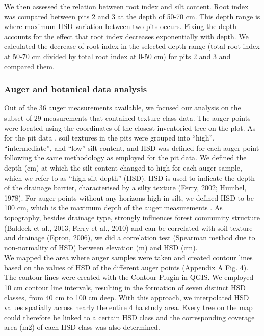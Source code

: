 \documentclass[fleqn,12pt]{latex/stylish_article} %
\begin{document}
We then assessed the relation between root index and silt content. Root index was compared between pits 2 and 3 at the depth of 50-70 cm. This depth range is where maximum HSD variation between two pits occurs. Fixing the depth accounts for the effect that root index decreases exponentially with depth. We calculated the decrease of root index in the selected depth range (total root index at 50-70 cm divided by total root index at 0-50 cm) for pits 2 and 3 and compared them.

\hypertarget{auger-and-botanical-data-analysis}{%
\subsubsection{Auger and botanical data analysis}\label{auger-and-botanical-data-analysis}}

Out of the 36 auger measurements available, we focused our analysis on the subset of 29 measurements that contained texture class data. The auger points were located using the coordinates of the closest inventoried tree on the plot. As for the pit data , soil textures in the pits were grouped into \enquote{high}, \enquote{intermediate}, and \enquote{low} silt content, and HSD was defined for each auger point following the same methodology as employed for the pit data. We defined the depth (cm) at which the silt content changed to high for each auger sample, which we refer to as \enquote{high silt depth} (HSD). HSD is used to indicate the depth of the drainage barrier, characterised by a silty texture (Ferry, 2002; Humbel, 1978). For auger points without any horizons high in silt, we defined HSD to be 100 cm, which is the maximum depth of the auger measurements . As topography, besides drainage type, strongly influences forest community structure (Baldeck et al., 2013; Ferry et al., 2010) and can be correlated with soil texture and drainage (Epron, 2006), we did a correlation test (Spearman method due to non-normality of HSD) between elevation (m) and HSD (cm).\\
We mapped the area where auger samples were taken and created contour lines based on the values of HSD of the different auger points (Appendix A Fig. 4). The contour lines were created with the Contour Plugin in QGIS. We employed 10 cm contour line intervals, resulting in the formation of seven distinct HSD classes, from 40 cm to 100 cm deep. With this approach, we interpolated HSD values spatially across nearly the entire 4 ha study area. Every tree on the map could therefore be linked to a certain HSD class and the corresponding coverage area (m2) of each HSD class was also determined.
\end{document}
